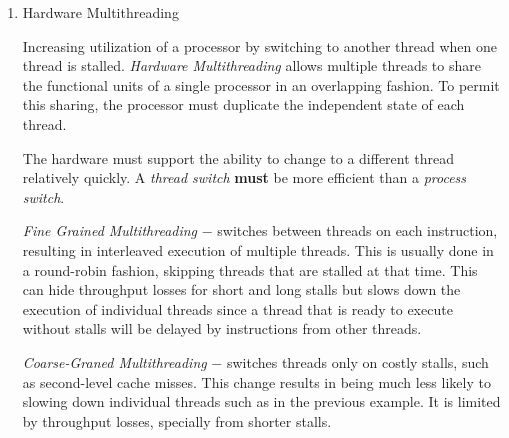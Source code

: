 \documentclass[12pt]{article}
\newenvironment{QandA}{\begin{enumerate}[label=\bfseries\arabic*.]\bfseries}
                      {\end{enumerate}}
\newenvironment{answered}{\par\quad\normalfont}{}
\begin{document}
\begin{QandA}
\ 

\item Hardware Multithreading
\begin{answered}
Increasing utilization of a processor by switching to another thread when one thread is stalled. \textit{Hardware Multithreading} allows multiple threads to share the functional units of a single processor in an overlapping fashion. To permit this sharing, the processor must duplicate the independent state of each thread. 

\quad The hardware must support the ability to change to a different thread relatively quickly. A \textit{thread switch} \textbf{must} be more efficient than a \textit{process switch}. 

\textit{Fine Grained Multithreading} $-$ switches between threads on each instruction, resulting in interleaved execution of multiple threads. This is usually done in a round-robin fashion, skipping threads that are stalled at that time. This can hide throughput losses for short and long stalls but slows down the execution of individual threads since a thread that is ready to execute without stalls will be delayed by instructions from other threads.

\textit{Coarse-Graned Multithreading} $-$ switches threads only on costly stalls, such as second-level cache misses. This change results in being much less likely to slowing down individual threads such as in the previous example. It is limited by throughput losses, specially from shorter stalls. 
\end{answered}

\end{QandA}
\end{document}

